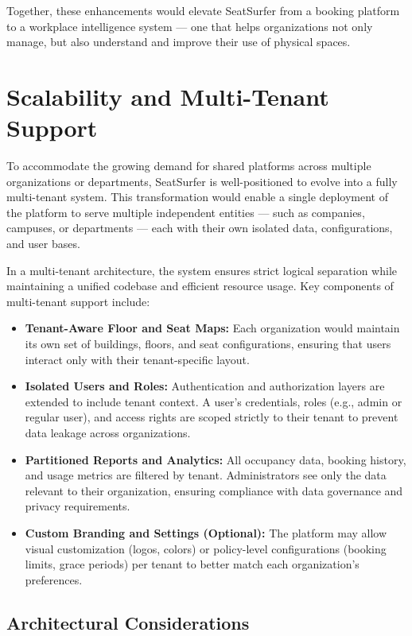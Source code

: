 \documentclass[12pt,a4paper]{report}
\begin{document}
Together, these enhancements would elevate SeatSurfer from a booking platform to a workplace intelligence system — one that helps organizations not only manage, but also understand and improve their use of physical spaces.

\section{Scalability and Multi-Tenant Support}

To accommodate the growing demand for shared platforms across multiple organizations or departments, SeatSurfer is well-positioned to evolve into a fully multi-tenant system. This transformation would enable a single deployment of the platform to serve multiple independent entities — such as companies, campuses, or departments — each with their own isolated data, configurations, and user bases.

In a multi-tenant architecture, the system ensures strict logical separation while maintaining a unified codebase and efficient resource usage. Key components of multi-tenant support include:

\begin{itemize}
\item \textbf{Tenant-Aware Floor and Seat Maps:}
Each organization would maintain its own set of buildings, floors, and seat configurations, ensuring that users interact only with their tenant-specific layout.
\item \textbf{Isolated Users and Roles:}  
Authentication and authorization layers are extended to include tenant context. A user's credentials, roles (e.g., admin or regular user), and access rights are scoped strictly to their tenant to prevent data leakage across organizations.
\item \textbf{Partitioned Reports and Analytics:}  
All occupancy data, booking history, and usage metrics are filtered by tenant. Administrators see only the data relevant to their organization, ensuring compliance with data governance and privacy requirements.
\item \textbf{Custom Branding and Settings (Optional):}  
The platform may allow visual customization (logos, colors) or policy-level configurations (booking limits, grace periods) per tenant to better match each organization's preferences.
\end{itemize}

\subsection*{Architectural Considerations}
\end{document}
